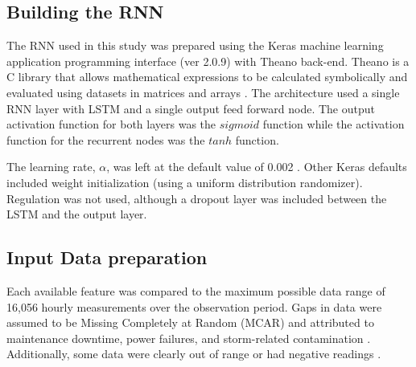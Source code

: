 \subsection{Building the RNN}
The RNN used in this study was prepared using the Keras machine learning application programming interface (ver 2.0.9) \citep{keras2015} with Theano back-end. Theano is a C\+\+ library that allows mathematical expressions to be calculated symbolically and evaluated using datasets in matrices and arrays \citep{Theano2016}. The architecture used a single RNN layer with LSTM and a single output feed forward node. The output activation function for both layers was the $sigmoid$ function while the activation function for the recurrent nodes was the $tanh$ function. 

The learning rate, $\alpha$, was left at the default value of 0.002 \citep{keras2015}. Other Keras defaults included weight initialization (using a uniform distribution randomizer). Regulation was not used, although a dropout layer was included between the LSTM and the output layer. 

\subsection{Input Data preparation}
Each available feature was compared to the maximum possible data range of 16,056 hourly measurements over the observation period. Gaps in data were assumed to be Missing Completely at Random (MCAR) and attributed to maintenance downtime, power failures, and storm-related contamination \citep{Le2007}. Additionally, some data were clearly out of range or had negative readings \citep{Junger2015}.

